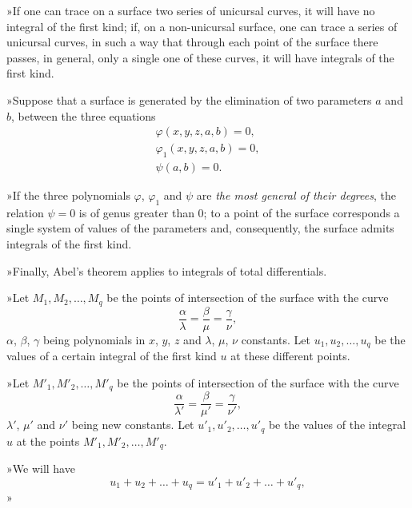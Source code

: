 \documentclass{article}
\begin{document}
»If one can trace on a surface two series of unicursal curves, it will have no integral of the first kind; if, on a non-unicursal surface, one can trace a series of unicursal curves, in such a way that through each point of the surface there passes, in general, only a single one of these curves, it will have integrals of the first kind.

»Suppose that a surface is generated by the elimination of two
parameters $a$ and $b$, between the three equations
\[
\begin{gathered}
\varphi(x, y, z, a, b) = 0, \\
\varphi_{1}(x, y, z, a, b) = 0, \\
\psi(a, b) = 0.
\end{gathered}
\]

»If the three polynomials $\varphi$, $\varphi_{1}$ and $\psi$ are \emph{the most general of their degrees}, the relation $\psi = 0$ is of genus greater than 0; to a point of the surface corresponds a single system of values of the parameters and, consequently, the surface admits integrals of the first kind.

»Finally, Abel's theorem applies to integrals of total differentials.

»Let $M_{1}, M_{2}, \ldots, M_{q}$ be the points of intersection of the surface with the curve
\[
\frac{\alpha}{\lambda} = \frac{\beta}{\mu} = \frac{\gamma}{\nu},
\]
$\alpha$, $\beta$, $\gamma$ being polynomials in $x$, $y$, $z$ and $\lambda$, $\mu$, $\nu$ constants. Let $u_{1}, u_{2}, \ldots, u_{q}$ be the values of a certain integral of the first kind $u$ at these different points.

»Let $M'_{1}, M'_{2}, \ldots, M'_{q}$ be the points of intersection of the surface with the curve
\[
\frac{\alpha}{\lambda'} = \frac{\beta}{\mu'} = \frac{\gamma}{\nu'},
\]
$\lambda'$, $\mu'$ and $\nu'$ being new constants. Let $u'_{1}, u'_{2}, \ldots, u'_{q}$ be the values of the integral $u$ at the points $M'_{1}, M'_{2}, \ldots, M'_{q}$.

»We will have
\[
u_{1} + u_{2} + \ldots + u_{q} = u'_{1} + u'_{2} + \ldots + u'_{q},
\]»
\end{document}
